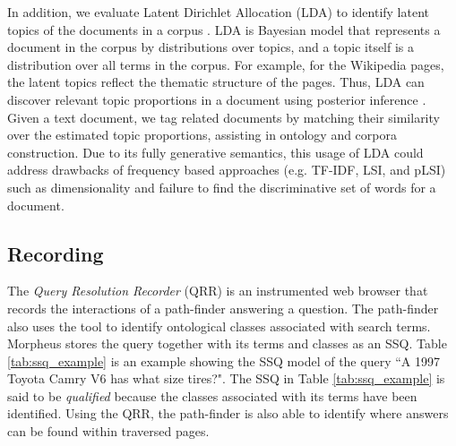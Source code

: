 In addition, we evaluate Latent Dirichlet Allocation (LDA) to identify latent topics of the documents in a corpus \cite{Blei2003latentdirichlet}.  LDA is Bayesian model that represents a document in the corpus by distributions over topics, and a topic itself is a distribution over all  terms in the corpus.  For example, for the Wikipedia pages, the latent topics reflect the thematic structure of the pages. Thus, LDA can discover relevant topic proportions in a document using posterior inference \cite{Blei2003latentdirichlet}. Given a text document, we tag related documents by matching their similarity over the estimated topic proportions, assisting in ontology and corpora construction.  Due to its fully generative semantics, this usage of LDA could address drawbacks of frequency based approaches (e.g. TF-IDF, LSI, and pLSI) such as dimensionality and failure to find the discriminative set of words for a document. %


\subsection{ Recording}
\label{sec:query_processing}


The \emph{Query Resolution Recorder} (QRR) is an instrumented web browser that records the interactions of a path-finder answering a question. The path-finder also uses the tool to identify ontological classes associated with search terms. Morpheus stores the query together with its terms and classes as an SSQ.  Table \ref{tab:ssq_example} is an example showing the SSQ model of the query ``A 1997 Toyota Camry V6 has what size tires?". The SSQ in Table \ref{tab:ssq_example} is said to be \emph{qualified} because the classes associated with its terms have been identified. Using the QRR, the path-finder is also able to identify where answers can be found within traversed pages.





